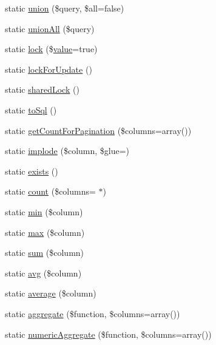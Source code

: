 \begin{DoxyCompactItemize}
\item 
static \mbox{\hyperlink{class_eloquent_a24685bd0575b3a51452944bee875b83c}{union}} (\$query, \$all=false)
\item 
static \mbox{\hyperlink{class_eloquent_a7a81a35976fe17001e5a7ffad92f5256}{union\+All}} (\$query)
\item 
static \mbox{\hyperlink{class_eloquent_a99a6223b6ef3008aff9b1d113f67449f}{lock}} (\$\mbox{\hyperlink{class_eloquent_a653061eb837042f61e82447886e15a72}{value}}=true)
\item 
static \mbox{\hyperlink{class_eloquent_a8424881c1216eeb0bf339b38c713a090}{lock\+For\+Update}} ()
\item 
static \mbox{\hyperlink{class_eloquent_a7f299b24133d1b7b5614210b34907801}{shared\+Lock}} ()
\item 
static \mbox{\hyperlink{class_eloquent_ac788e862f43bba3f9d0ff6a13b82774b}{to\+Sql}} ()
\item 
static \mbox{\hyperlink{class_eloquent_a1978abdf53fe44de908f19767234e984}{get\+Count\+For\+Pagination}} (\$columns=array())
\item 
static \mbox{\hyperlink{class_eloquent_a61e6ba8ce2c591132da5397c88b976b9}{implode}} (\$column, \$glue=\textquotesingle{}\textquotesingle{})
\item 
static \mbox{\hyperlink{class_eloquent_a0778402ef6d4010610378d9a470e6d4b}{exists}} ()
\item 
static \mbox{\hyperlink{class_eloquent_af7f114e287681eb2333c97d6bf26285d}{count}} (\$columns=\textquotesingle{} $\ast$\textquotesingle{})
\item 
static \mbox{\hyperlink{class_eloquent_a0c9b274069dc6503f3ac3d7592c7c69d}{min}} (\$column)
\item 
static \mbox{\hyperlink{class_eloquent_a74732442e996af19bbb46d839a6fddf3}{max}} (\$column)
\item 
static \mbox{\hyperlink{class_eloquent_a74c6b202fd0d2f82c2dc9a326ab4f8fc}{sum}} (\$column)
\item 
static \mbox{\hyperlink{class_eloquent_a0b3828a100dd3fdcb15a5df6bc4c0f16}{avg}} (\$column)
\item 
static \mbox{\hyperlink{class_eloquent_a7ad1944b3c3cc2e9f11b9d028ffa5501}{average}} (\$column)
\item 
static \mbox{\hyperlink{class_eloquent_abebad76dc3dba8a1894b8a2554e0a4ff}{aggregate}} (\$function, \$columns=array())
\item 
static \mbox{\hyperlink{class_eloquent_ae0d141ad31eacf1a97177bb8b1e896e0}{numeric\+Aggregate}} (\$function, \$columns=array())

\end{DoxyCompactItemize}
